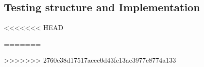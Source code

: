 \documentclass[10pt,twocolumn]{witseiepaper}
\begin{document}








\subsection{Testing structure and Implementation}

<<<<<<< HEAD



=======


>>>>>>> 2760e38d17517acec0d43fc13ae3977c8774a133
\end{document}
